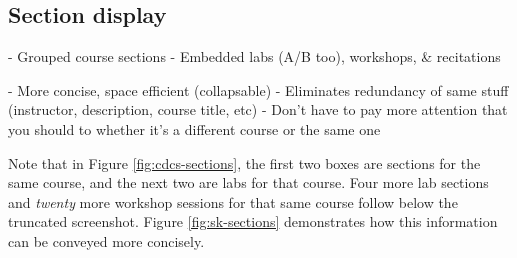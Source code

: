 \subsection{Section display}

- Grouped course sections
- Embedded labs (A/B too), workshops, \& recitations

- More concise, space efficient (collapsable)
- Eliminates redundancy of same stuff (instructor, description, course title, etc)
- Don't have to pay more attention that you should to whether it's a different course or the same one

Note that in Figure \ref{fig:cdcs-sections}, the first two boxes are sections for the same course, and the next two are labs for that course. Four more lab sections and \emph{twenty} more workshop sessions for that same course follow below the truncated screenshot. Figure \ref{fig:sk-sections} demonstrates how this information can be conveyed more concisely.

